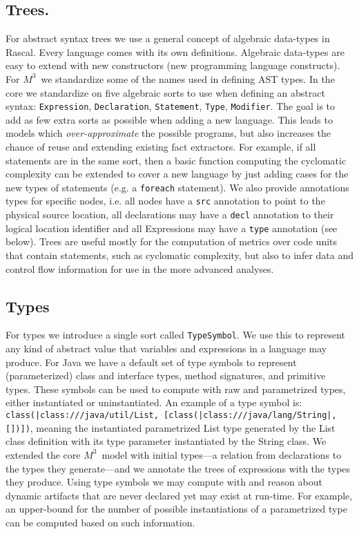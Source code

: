 \documentclass[conference]{IEEEtran}
\newcommand{\loc}[1]{\small{\texttt{#1}}\xspace}
\newcommand{\mthree}{\ensuremath{M^3}\xspace}
\begin{document}
\subsection{Trees.} For abstract syntax trees we use a general concept of
algebraic data-types in Rascal. Every language comes with its own definitions.
Algebraic data-types are easy to extend with new constructors (new programming
language constructs). For \mthree\ we standardize some of the names used in
defining AST types. In the core we standardize on five algebraic sorts to use
when defining an abstract syntax: \texttt{Expression}, \texttt{Declaration},
\texttt{Statement}, \texttt{Type}, \texttt{Modifier}. The goal is to add as
few extra sorts as possible when adding a new language. This leads to models
which \emph{over-approximate} the possible programs, but also increases the
chance of reuse and extending existing fact extractors. For example, if all
statements are in the same sort, then a basic function computing the
cyclomatic complexity can be extended to cover a new language by just adding
cases for the new types of statements (e.g. a \texttt{foreach} statement). We
also provide annotations types for specific nodes, i.e. all nodes have a
\texttt{src} annotation to point to the physical source location, all
declarations may have a \texttt{decl} annotation to their logical location
identifier and all Expressions may have a \texttt{type} annotation (see
below).
%
Trees are useful mostly for the computation of metrics over code units that
contain statements, such as cyclomatic complexity, but also to infer data and
control flow information for use in the more advanced analyses. 


\subsection{Types} For types we introduce a single sort called
\texttt{TypeSymbol}. We use this to represent any kind of abstract value that
variables and expressions in a language may produce. For Java we have a
default set of type symbols to represent (parameterized) class and interface
types, method signatures, and primitive types. These symbols can be used to
compute with raw and parametrized types, either instantiated or
uninstantiated. An example of a type symbol is:
\loc{class(|class:///java/util/List, [class(|class:///java/lang/String|,[])])}, 
meaning the instantiated
parametrized List type generated by the List class definition with its type
parameter instantiated by the String class. We extended the core \mthree\
model with initial types---a relation from declarations to the types they
generate---and we annotate the trees of expressions with the types they produce.
Using type symbols we may compute with and reason about dynamic artifacts that
are never declared yet may exist at run-time. For example, an upper-bound for
the number of possible instantiations of a parametrized type can be computed
based on such information.
\end{document}
